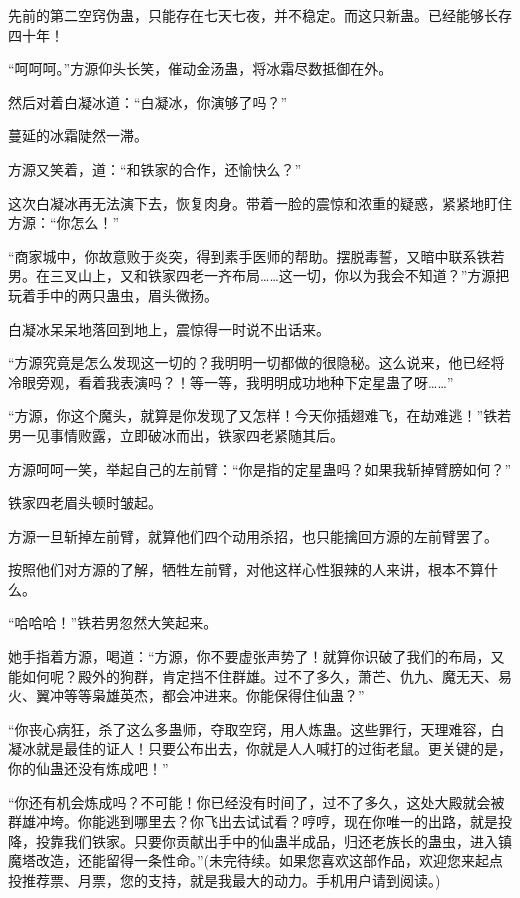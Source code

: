 \begin{this_body}
先前的第二空窍伪蛊，只能存在七天七夜，并不稳定。而这只新蛊。已经能够长存四十年！

“呵呵呵。”方源仰头长笑，催动金汤蛊，将冰霜尽数抵御在外。

然后对着白凝冰道：“白凝冰，你演够了吗？”

蔓延的冰霜陡然一滞。

方源又笑着，道：“和铁家的合作，还愉快么？”

这次白凝冰再无法演下去，恢复肉身。带着一脸的震惊和浓重的疑惑，紧紧地盯住方源：“你怎么！”

“商家城中，你故意败于炎突，得到素手医师的帮助。摆脱毒誓，又暗中联系铁若男。在三叉山上，又和铁家四老一齐布局……这一切，你以为我会不知道？”方源把玩着手中的两只蛊虫，眉头微扬。

白凝冰呆呆地落回到地上，震惊得一时说不出话来。

“方源究竟是怎么发现这一切的？我明明一切都做的很隐秘。这么说来，他已经将冷眼旁观，看着我表演吗？！等一等，我明明成功地种下定星蛊了呀……”

“方源，你这个魔头，就算是你发现了又怎样！今天你插翅难飞，在劫难逃！”铁若男一见事情败露，立即破冰而出，铁家四老紧随其后。

方源呵呵一笑，举起自己的左前臂：“你是指的定星蛊吗？如果我斩掉臂膀如何？”

铁家四老眉头顿时皱起。

方源一旦斩掉左前臂，就算他们四个动用杀招，也只能擒回方源的左前臂罢了。

按照他们对方源的了解，牺牲左前臂，对他这样心性狠辣的人来讲，根本不算什么。

“哈哈哈！”铁若男忽然大笑起来。

她手指着方源，喝道：“方源，你不要虚张声势了！就算你识破了我们的布局，又能如何呢？殿外的狗群，肯定挡不住群雄。过不了多久，萧芒、仇九、魔无天、易火、翼冲等等枭雄英杰，都会冲进来。你能保得住仙蛊？”

“你丧心病狂，杀了这么多蛊师，夺取空窍，用人炼蛊。这些罪行，天理难容，白凝冰就是最佳的证人！只要公布出去，你就是人人喊打的过街老鼠。更关键的是，你的仙蛊还没有炼成吧！”

“你还有机会炼成吗？不可能！你已经没有时间了，过不了多久，这处大殿就会被群雄冲垮。你能逃到哪里去？你飞出去试试看？哼哼，现在你唯一的出路，就是投降，投靠我们铁家。只要你贡献出手中的仙蛊半成品，归还老族长的蛊虫，进入镇魔塔改造，还能留得一条性命。”(未完待续。如果您喜欢这部作品，欢迎您来起点投推荐票、月票，您的支持，就是我最大的动力。手机用户请到阅读。)

\end{this_body}

